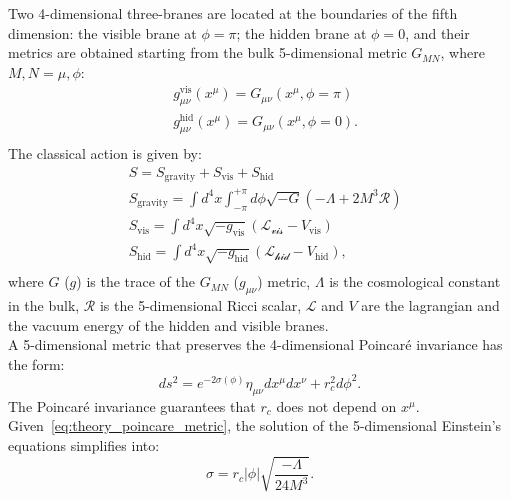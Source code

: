 Two 4-dimensional three-branes are located at the boundaries of the fifth dimension: the visible brane at $\phi = \pi$; the hidden brane at $\phi = 0$, and their metrics are obtained starting from the bulk 5-dimensional metric $G_{MN}$, where $M,N = \mu, \phi$:
\begin{equation}
\begin{split}
 & g_{\mu \nu}^{\text{vis}} (x^{\mu}) = G_{\mu \nu} \left( x^{\mu}, \phi = \pi \right)\\
 & g_{\mu \nu}^{\text{hid}} (x^{\mu}) = G_{\mu \nu} \left( x^{\mu}, \phi = 0 \right).\\
\end{split}
\label{eq:theory_brane_metrics}
\end{equation}
The classical action is given by:
\begin{equation}
\begin{split}
 & S = S_{\text{gravity}} + S_{\text{vis}} + S_{\text{hid}}\\
 & S_{\text{gravity}} = \int d^4x \int_{-\pi}^{+\pi} d\phi \sqrt{-G} \left( -\Lambda + 2 M^3 \mathcal{R} \right)\\
 & S_{\text{vis}} = \int d^4x \sqrt{-g_{\text{vis}}} \left( \mathcal{L_{\text{vis}}} -V_{\text{vis}} \right)\\
 & S_{\text{hid}} = \int d^4x \sqrt{-g_{\text{hid}}} \left( \mathcal{L_{\text{hid}}} -V_{\text{hid}} \right),\\
\end{split}
\label{eq:theory_classical_action}
\end{equation}
where $G$ ($g$) is the trace of the $G_{MN}$ ($g_{\mu \nu}$) metric, $\Lambda$ is the cosmological constant in the bulk, $\mathcal{R}$ is the 5-dimensional Ricci scalar, $\mathcal{L}$ and $V$ are the lagrangian and the vacuum energy of the hidden and visible branes.\\
A 5-dimensional metric that preserves the 4-dimensional Poincar\'e invariance has the form:
\begin{equation}
ds^2 = e^{-2 \sigma(\phi)} \eta_{\mu \nu} dx^{\mu} dx^{\nu} + r_c^2 d{\phi}^2.
\label{eq:theory_poincare_metric}
\end{equation}
The Poincar\'e invariance guarantees that $r_c$ does not depend on $x^{\mu}$. Given~\ref{eq:theory_poincare_metric}, the solution of the 5-dimensional Einstein's equations simplifies into:
\begin{equation}
\sigma = r_c \left| \phi \right| \sqrt{\frac{- \Lambda}{24 M^3}}.
\label{eq:theory_einstein_solution}
\end{equation}
